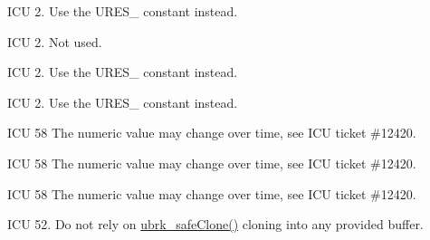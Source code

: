 \begin{DoxyRefList}
%
I\+CU 2. Use the U\+R\+E\+S\+\_\+ constant instead.  
\item[Member \mbox{\hyperlink{ures_8h_a3f1197bf41a6228c38e3fddb58bf96fbabb8f79bd6e07400f6870fe51ae24fcef}{R\+E\+S\+\_\+\+R\+E\+S\+E\+R\+V\+ED}} ]\label{deprecated__deprecated000081}%
%
I\+CU 2. Not used.  
\item[Member \mbox{\hyperlink{ures_8h_a3f1197bf41a6228c38e3fddb58bf96fbad6c0349cb0484769c040d660de1c7445}{R\+E\+S\+\_\+\+S\+T\+R\+I\+NG}} ]\label{deprecated__deprecated000074}%
%
I\+CU 2. Use the U\+R\+E\+S\+\_\+ constant instead.  
\item[Member \mbox{\hyperlink{ures_8h_a3f1197bf41a6228c38e3fddb58bf96fbac93b5478e79d51b10747d617765069af}{R\+E\+S\+\_\+\+T\+A\+B\+LE}} ]\label{deprecated__deprecated000076}%
%
I\+CU 2. Use the U\+R\+E\+S\+\_\+ constant instead.  
\item[Member \mbox{\hyperlink{ubidi_8h_ab74f3e4fed22db8d521e42f6a882b7a1}{U\+\_\+\+B\+I\+D\+I\+\_\+\+C\+L\+A\+S\+S\+\_\+\+D\+E\+F\+A\+U\+LT}} ]\label{deprecated__deprecated000001}%
%
I\+CU 58 The numeric value may change over time, see I\+CU ticket \#12420.  
\item[Member \mbox{\hyperlink{uchar_8h_af954219aa1df452657ec355221c6703da6dc2fa1c8af7ed844ba9826cdc19821a}{U\+\_\+\+B\+P\+T\+\_\+\+C\+O\+U\+NT}} ]\label{deprecated__deprecated000017}%
%
I\+CU 58 The numeric value may change over time, see I\+CU ticket \#12420.  
\item[Member \mbox{\hyperlink{utypes_8h_a3343c1c8a8377277046774691c98d78ca6f7028fcc27d5e583873df027be17718}{U\+\_\+\+B\+R\+K\+\_\+\+E\+R\+R\+O\+R\+\_\+\+L\+I\+M\+IT}} ]\label{deprecated__deprecated000235}%
%
I\+CU 58 The numeric value may change over time, see I\+CU ticket \#12420.  
\item[Member \mbox{\hyperlink{ubrk_8h_ab17dc88e0028fd85c622889eea22a6fa}{U\+\_\+\+B\+R\+K\+\_\+\+S\+A\+F\+E\+C\+L\+O\+N\+E\+\_\+\+B\+U\+F\+F\+E\+R\+S\+I\+ZE}} ]\label{deprecated__deprecated000004}%
%
I\+CU 52. Do not rely on \mbox{\hyperlink{ubrk_8h_a2b418014e541f87ff0b2732c815f751b}{ubrk\+\_\+safe\+Clone()}} cloning into any provided buffer.  
\item[Member \mbox{\hyperlink{uchar_8h_a50325108b69e7d08315b5854f85f0593a6ef7d8987718e33961e6a15739343af9}{U\+\_\+\+C\+H\+A\+R\+\_\+\+D\+I\+R\+E\+C\+T\+I\+O\+N\+\_\+\+C\+O\+U\+NT}} ]\label{deprecated__deprecated000016}%

\end{DoxyRefList}
